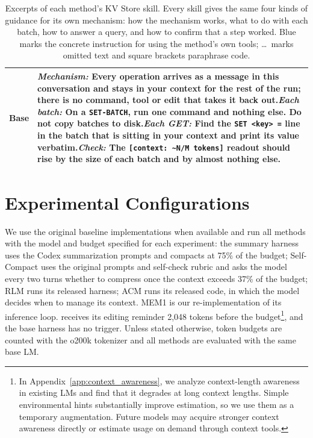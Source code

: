 \begin{table}[!htbp]
\begin{tabular}{@{}l>{\raggedright\arraybackslash}p{12.4cm}@{}}
Base & \textit{Mechanism:} Every operation arrives as a message in this conversation and stays in your context for the rest of the run; there is no command, tool or edit that takes it back out.\newline \textit{Each batch:} \textcolor{clmblue}{On a \texttt{SET-BATCH}, run one command and nothing else.} \textcolor{clmblue}{Do not copy batches to disk.}\newline \textit{Each GET:} \textcolor{clmblue}{Find the \texttt{SET <key> =} line in the batch that is sitting in your context and print its value verbatim.}\newline \textit{Check:} The \texttt{[context: \textasciitilde N/M tokens]} readout should rise by the size of each batch and by almost nothing else. \\
\bottomrule
\end{tabular}
\caption{Excerpts of each method's KV Store skill. Every skill gives the same four kinds of guidance for its own mechanism: how the mechanism works, what to do with each batch, how to answer a query, and how to confirm that a step worked. \textcolor{clmblue}{Blue} marks the concrete instruction for using the method's own tools; \ldots\ marks omitted text and square brackets paraphrase code.}
\label{tab:ourbench_skills}
\end{table}

\section{Experimental Configurations}\label{app:eval_config}

We use the original baseline implementations when available and run all methods with the model and budget specified for each experiment: the summary harness uses the Codex summarization prompts and compacts at 75\% of the budget; Self-Compact uses the original prompts and self-check rubric and asks the model every two turns whether to compress once the context exceeds 37\% of the budget; RLM runs its released harness; ACM runs its released code, in which the model decides when to manage its context. MEM1 is our re-implementation of its inference loop.
\ours{} receives its editing reminder 2{,}048 tokens before the budget\footnote{In Appendix~\ref{app:context_awareness}, we analyze context-length awareness in existing LMs and find that it degrades at long context lengths. Simple environmental hints substantially improve estimation, so we use them as a temporary augmentation. Future models may acquire stronger context awareness directly or estimate usage on demand through context tools.}, and the base harness has no trigger. 
Unless stated otherwise, token budgets are counted with the o200k tokenizer and all methods are evaluated with the same base LM.

